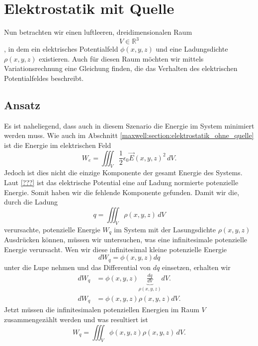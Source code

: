 \section{Elektrostatik mit Quelle
\label{maxwell:section:elektrostatik_mit_quelle}}
Nun betrachten wir einen luftleeren, dreidimensionalen Raum
\[
V\in\mathbb{R}^3
\]
, in dem ein elektrisches Potentialfeld $\phi(x,y,z)$ und eine Ladungsdichte $\rho(x,y,z)$ existieren.
Auch für diesen Raum möchten wir mittels Variationsrechnung eine Gleichung finden, die das Verhalten des elektrischen Potentialfeldes beschreibt.

\subsection{Ansatz}
Es ist naheliegend, dass auch in diesem Szenario die Energie im System minimiert werden muss.
Wie auch im Abschnitt \ref{maxwell:section:elektrostatik_ohne_quelle} ist die Energie im elektrischen Feld
\[
W_e
=
\iiint_V \frac{1}{2}\epsilon_0\vec{E}(x,y,z)^2\, dV.
\]
Jedoch ist dies nicht die einzige Komponente der gesamt Energie des Systems.
Laut \ref{???} ist das elektrische Potential eine auf Ladung normierte potenzielle Energie.
Somit haben wir die fehlende Komponente gefunden.
Damit wir die, durch die Ladung
\[
q
=
\iiint_V \rho(x,y,z)\, dV
\]
verursachte, potenzielle Energie $W_q$ im System mit der Lasungsdichte $\rho(x,y,z)$ Ausdrücken können, müssen wir untersuchen, was eine infinitesimale potenzielle Energie verursacht.
Wen wir diese infinitesimal kleine potenzielle Energie
\[
dW_q
=
\phi(x,y,z)dq
\]
unter die Lupe nehmen und das Differential von $dq$ einsetzen, erhalten wir
\begin{align*}
dW_q
&=
\phi(x,y,z)\underbrace{\frac{dq}{dV}}_{\rho(x,y,z)}dV.
\\
dW_q
&=
\phi(x,y,z)\rho(x,y,z)dV.
\end{align*}
Jetzt müssen die infinitesimalen potenziellen Energien im Raum $V$ zusammengezählt werden und was resultiert ist
\begin{equation}
W_q
=
\iiint_V \phi(x,y,z)\rho(x,y,z)\, dV.
\label{maxwell:section:potenzielle_energie_ladung}
\end{equation}
